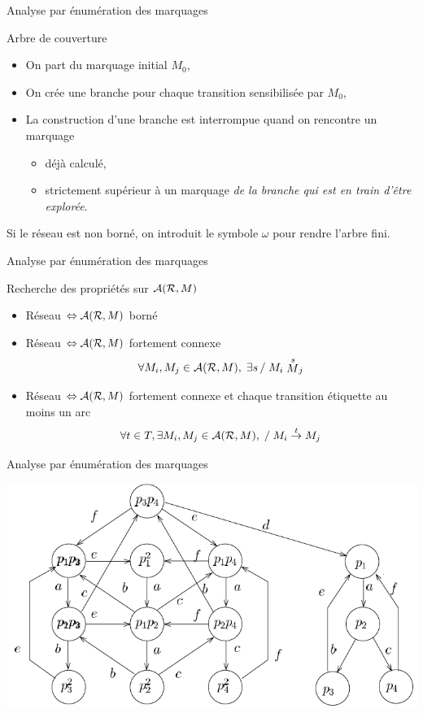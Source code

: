 \documentclass[compress]{beamer}
\begin{document}
\begin{frame}{Analyse par énumération des marquages}
\begin{block}{Arbre de couverture}
\begin{itemize}
\item On part du marquage initial $M_0$,
\item On crée une branche pour chaque transition sensibilisée par $M_0$,
\item La construction d'une branche est interrompue quand on rencontre un marquage
	\begin{itemize}
	\item déjà calculé,
	\item strictement supérieur à un marquage {\em de la branche qui est en train d'être explorée}.
	\end{itemize}
\end{itemize}  
Si le réseau est non borné, on introduit le symbole $\omega$ pour rendre l'arbre fini.
\end{block}
\end{frame}  
 
\begin{frame}{Analyse par énumération des marquages}
\begin{block}{Recherche des propriétés sur ${\cal A(R},M)$}
\begin{itemize}
\item Réseau  $\Leftrightarrow {\cal A(R},M)$ borné
\item Réseau  $\Leftrightarrow {\cal A(R},M)$ fortement connexe
$$\forall M_i, M_j \in {\cal A(R},M), \; \exists s \, / \; M_i \stackrel{s} M_j$$
\item Réseau  $\Leftrightarrow {\cal A(R},M)$ fortement connexe et chaque transition étiquette au moins un arc
$$\forall t \in T, \exists M_i, M_j \in {\cal A(R},M), \; / \; M_i
\stackrel{t}{\rightarrow} M_j$$
\end{itemize}  
\end{block}
\end{frame}  

\begin{frame}{Analyse par énumération des marquages}
\begin{center}
\includegraphics[width=.8\linewidth]{qviva-g}
\end{center}
\end{frame}  
 
\end{document}
